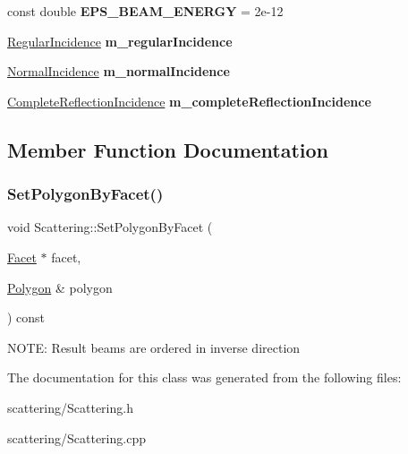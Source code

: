 \begin{DoxyCompactItemize}
const double {\bfseries E\+P\+S\+\_\+\+B\+E\+A\+M\+\_\+\+E\+N\+E\+R\+GY} = 2e-\/12
\item 
\mbox{\label{class_scattering_a3f471d07fae2b3c9eede14e9ea543f50}} 
\mbox{\hyperlink{class_regular_incidence}{Regular\+Incidence}} {\bfseries m\+\_\+regular\+Incidence}
\item 
\mbox{\label{class_scattering_a42d796c6e0ca51fd73022a4f54e457f5}} 
\mbox{\hyperlink{class_normal_incidence}{Normal\+Incidence}} {\bfseries m\+\_\+normal\+Incidence}
\item 
\mbox{\label{class_scattering_a7dc66db9ff2cf273cd19676f69cdae3a}} 
\mbox{\hyperlink{class_complete_reflection_incidence}{Complete\+Reflection\+Incidence}} {\bfseries m\+\_\+complete\+Reflection\+Incidence}
\end{DoxyCompactItemize}


\subsection{Member Function Documentation}
\mbox{\label{class_scattering_abdf7a6563ec37996654fa59ab99bab3f}} 
\subsubsection{\texorpdfstring{Set\+Polygon\+By\+Facet()}{SetPolygonByFacet()}}
{\footnotesize\ttfamily void Scattering\+::\+Set\+Polygon\+By\+Facet (\begin{DoxyParamCaption}\item[{\mbox{\hyperlink{class_facet}{Facet}} $\ast$}]{facet,  }\item[{\mbox{\hyperlink{class_polygon}{Polygon}} \&}]{polygon }\end{DoxyParamCaption}) const\hspace{0.3cm}{\ttfamily [protected]}}

N\+O\+TE\+: Result beams are ordered in inverse direction 

The documentation for this class was generated from the following files\+:\begin{DoxyCompactItemize}
\item 
scattering/Scattering.\+h\item 
scattering/Scattering.\+cpp\end{DoxyCompactItemize}
